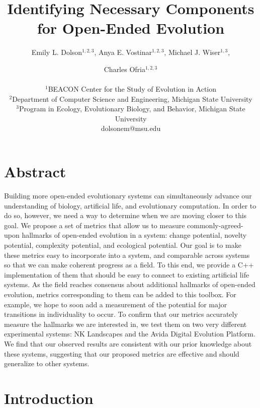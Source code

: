 \documentclass[letterpaper]{article}
\title{Identifying Necessary Components for Open-Ended Evolution}
\author{Emily L. Dolson$^{1,2,3}$, Anya E. Vostinar$^{1,2,3}$, Michael J. Wiser$^{1,3}$,\and Charles Ofria$^{1,2,3}$ \\
\mbox{}\\
$^1$BEACON Center for the Study of Evolution in Action  \\
$^2$Department of Computer Science and Engineering, Michigan State University \\
$^3$Program in Ecology, Evolutionary Biology, and Behavior, Michigan State University \\
dolsonem@msu.edu}
\begin{document}
\maketitle

\section{Abstract}

Building more open-ended evolutionary systems can simultaneously advance our understanding of biology, artificial life, and evolutionary computation. In order to do so, however, we need a way to determine when we are moving closer to this goal. We propose a set of metrics that allow us to measure commonly-agreed-upon hallmarks of open-ended evolution in a system: change potential, novelty potential, complexity potential, and ecological potential. Our goal is to make these metrics easy to incorporate into a system, and comparable across systems so that we can make coherent progress as a field. To this end, we provide a C++ implementation of them that should be easy to connect to existing artificial life systems. As the field reaches consensus about additional hallmarks of open-ended evolution, metrics corresponding to them can be added to this toolbox. For example, we hope to soon add a measurement of the potential for major transitions in individuality to occur. To confirm that our metrics accurately measure the hallmarks we are interested in, we test them on two very different experimental systems: NK Landscapes and the Avida Digital Evolution Platform. We find that our observed results are consistent with our prior knowledge about these systems, suggesting that our proposed metrics are effective and should generalize to other systems.

\section{Introduction}
\end{document}
